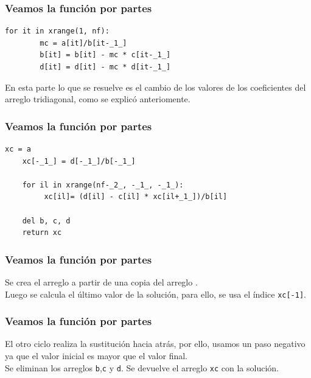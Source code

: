 \begin{frame}[fragile]
\frametitle{Veamos la función por partes}
\begin{lstlisting}[style=FormattedNumber, basicstyle=\linespread{1.1}\ttfamily=\small, columns=fullflexible]
    for it in xrange(1, nf):
        mc = a[it]/b[it-_1_]
        b[it] = b[it] - mc * c[it-_1_] 
        d[it] = d[it] - mc * d[it-_1_]
\end{lstlisting}
En esta parte lo que se resuelve es el cambio de los valores de los coeficientes del arreglo tridiagonal, como se explicó anteriomente.
\end{frame}
\begin{frame}[fragile]
\frametitle{Veamos la función por partes}
\begin{lstlisting}[style=FormattedNumber, basicstyle=\linespread{1.1}\ttfamily=\small, columns=fullflexible]
    xc = a
    xc[-_1_] = d[-_1_]/b[-_1_]

    for il in xrange(nf-_2_, -_1_, -_1_):
         xc[il]= (d[il] - c[il] * xc[il+_1_])/b[il]
        
    del b, c, d 
    return xc
\end{lstlisting}
\end{frame}
\begin{frame}[fragile]
\frametitle{Veamos la función por partes}
Se crea el arreglo  a partir de una copia del arreglo .
\\
\bigskip
Luego se calcula el último valor de la solución, para ello, se usa el índice \texttt{xc[-1]}.
\end{frame}
\begin{frame}[fragile]
\frametitle{Veamos la función por partes}
El otro ciclo  realiza la sustitución hacia atrás, por ello, usamos un paso negativo ya que el valor inicial es mayor que el valor final.
\\
\bigskip
Se eliminan los arreglos \texttt{b},\texttt{c} y \texttt{d}. Se devuelve el arreglo \texttt{xc} con la solución.
\end{frame}
